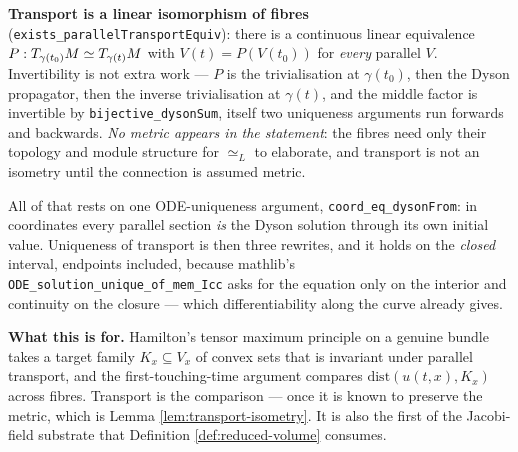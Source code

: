 \begin{lemma}
  \textbf{Transport is a linear isomorphism of fibres}
  (\texttt{exists\_parallelTransportEquiv}): there is a continuous linear equivalence
  $P : T_{\gamma(t_0)}M \simeq T_{\gamma(t)}M$ with $V(t) = P(V(t_0))$ for \emph{every}
  parallel $V$. Invertibility is not extra work --- $P$ is the trivialisation at
  $\gamma(t_0)$, then the Dyson propagator, then the inverse trivialisation at $\gamma(t)$,
  and the middle factor is invertible by \texttt{bijective\_dysonSum}, itself two uniqueness
  arguments run forwards and backwards. \emph{No metric appears in the statement}: the fibres
  need only their topology and module structure for $\simeq_L$ to elaborate, and transport is
  not an isometry until the connection is assumed metric.

  All of that rests on one ODE-uniqueness argument, \texttt{coord\_eq\_dysonFrom}: in
  coordinates every parallel section \emph{is} the Dyson solution through its own initial
  value. Uniqueness of transport is then three rewrites, and it holds on the \emph{closed}
  interval, endpoints included, because mathlib's \texttt{ODE\_solution\_unique\_of\_mem\_Icc}
  asks for the equation only on the interior and continuity on the closure --- which
  differentiability along the curve already gives.

  \textbf{What this is for.} Hamilton's tensor maximum principle on a genuine bundle takes a
  target family $K_x \subseteq V_x$ of convex sets that is invariant under parallel transport,
  and the first-touching-time argument compares $\mathrm{dist}(u(t,x),K_x)$ across fibres.
  Transport is the comparison --- once it is known to preserve the metric, which is Lemma
  \ref{lem:transport-isometry}. It is also the first of the Jacobi-field substrate that
  Definition \ref{def:reduced-volume} consumes.
\end{lemma}

